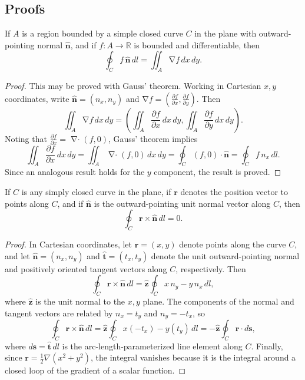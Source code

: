 \documentclass[10pt,fleqn,reqno]{article}
\newcommand\pd[2]{\frac{\partial #1}{\partial #2}}
\DeclareMathOperator\Grad{\nabla}
\DeclareMathOperator\Divg{\nabla\cdot}
\begin{document}
\begin{appendix}
\section{Proofs}
\begin{theorem} If $A$ is a region bounded by a simple closed curve $C$ in the plane with outward-pointing normal $\hat{\mathbf n}$, and if $f:A\to\mathbb R$ is bounded and differentiable, then \[\oint_C f\,\hat{\mathbf n}\,dl = \iint_A\Grad f\,dx\,dy.\]
\end{theorem}
\begin{proof} This may be proved with Gauss' theorem.  Working in Cartesian $x,y$ coordinates, write $\hat{\mathbf n}=(n_x,n_y)$ and $\Grad f=(\pd{f}{x},\pd{f}{y})$.  Then \[\iint_A\Grad f\,dx\,dy = \left(\iint_A\pd{f}{x}\,dx\,dy,\iint_A\pd{f}{y}\,dx\,dy\right).\]  Noting that $\pd{f}{x} = \Divg(f,0)$, Gauss' theorem implies \[\iint_A\pd{f}{x}\,dx\,dy = \iint_A\Divg(f,0)\,dx\,dy = \oint_C (f,0)\cdot\hat{\mathbf n}=\oint_C f\,n_x\,dl.\]  Since an analogous result holds for the $y$ component, the result is proved.
\end{proof}
\begin{theorem} If $C$ is any simply closed curve in the plane, if $\mathbf r$ denotes the position vector to points along $C$, and if $\hat{\mathbf n}$ is the outward-pointing unit normal vector along $C$, then \[\oint_C\mathbf r\times\hat{\mathbf n}\,dl = 0.\]
\end{theorem}
\begin{proof} In Cartesian coordinates, let $\mathbf r=(x,y)$ denote points along the curve $C$, and let $\hat{\mathbf n}=(n_x,n_y)$ and $\hat{\mathbf t}=(t_x,t_y)$ denote the unit outward-pointing normal and positively oriented tangent vectors along $C$, respectively.  Then \[\oint_C\mathbf r\times\hat{\mathbf n}\,dl = \hat{\mathbf z}\oint_C x\,n_y-y\,n_x\,dl,\] where $\hat{\mathbf z}$ is the unit normal to the $x,y$ plane.  The components of the normal and tangent vectors are related by $n_x = t_y$ and $n_y=-t_x$, so \[\oint_C\mathbf r\times\hat{\mathbf n}\,dl = \hat{\mathbf z}\oint_C x(-t_x)-y(t_y)\,dl=-\hat{\mathbf z}\oint_C\mathbf r\cdot d\mathbf s,\] where $d\mathbf s=\hat{\mathbf t}\,dl$ is the arc-length-parameterized line element along $C$.  Finally, since $\mathbf r = \frac{1}{2}\nabla(x^2+y^2)$, the integral vanishes because it is the integral around a closed loop of the gradient of a scalar function.
\end{proof}
\end{appendix}
\end{document}

